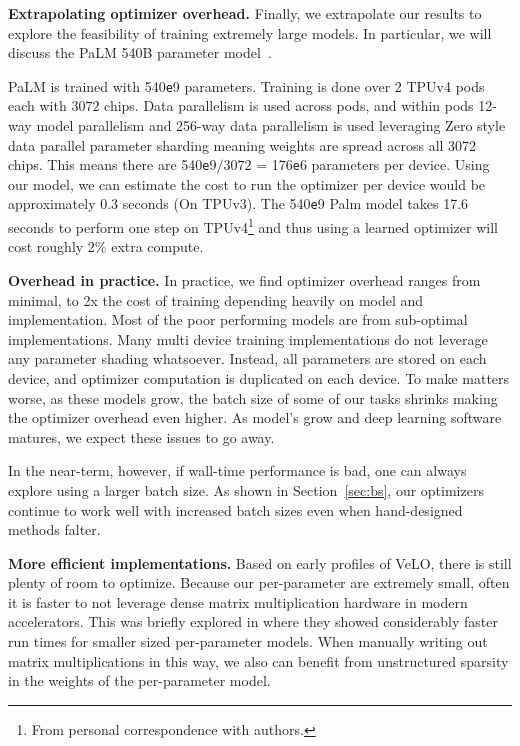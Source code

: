 \documentclass[11pt]{article}
\newcommand{\e}{\texttt{e}}
\begin{document}
\textbf{Extrapolating optimizer overhead.} Finally, we extrapolate our results to explore the feasibility of training extremely large models. In particular, we will discuss the PaLM 540B parameter model~\citep{chowdhery2022palm}.

PaLM is trained with 540\e9 parameters. Training is done over 2 TPUv4 pods each with $3072$ chips.
Data parallelism is used across pods, and within pods 12-way model parallelism and 256-way data parallelism is used leveraging Zero style data parallel parameter sharding meaning weights are spread across all 3072 chips.
This means there are 540\e9$/ 3072$ = 176\e6 parameters per device.
Using our model, we can estimate the cost to run the optimizer per device would be approximately 0.3 seconds (On TPUv3).
The 540\e9 Palm model takes 17.6 seconds to perform one step on TPUv4\footnote{From personal correspondence with authors.} and thus using a learned optimizer will cost roughly 2\% extra compute.

\textbf{Overhead in practice.}
In practice, we find optimizer overhead ranges from minimal, to 2x the cost of training depending heavily on model and implementation.
Most of the poor performing models are from sub-optimal implementations.
Many multi device training implementations do not leverage any parameter shading whatsoever.
Instead, all parameters are stored on each device, and optimizer computation is duplicated on each device.
To make matters worse, as these models grow, the batch size of some of our tasks shrinks making the optimizer overhead even higher.
As model's grow and deep learning software matures, we expect these issues to go away.

In the near-term, however, if wall-time performance is bad, one can always explore using a larger batch size. As shown in Section~\ref{sec:bs}, our optimizers continue to work well with increased batch sizes even when hand-designed methods falter.

\textbf{More efficient implementations.}
Based on early profiles of VeLO, there is still plenty of room to optimize.
Because our per-parameter are extremely small, often it is faster to not leverage dense matrix multiplication hardware in modern accelerators.
This was briefly explored in \citet{metz2022practical} where they showed considerably faster run times for smaller sized per-parameter models.
When manually writing out matrix multiplications in this way, we also can benefit from unstructured sparsity in the weights of the per-parameter model.
\end{document}
